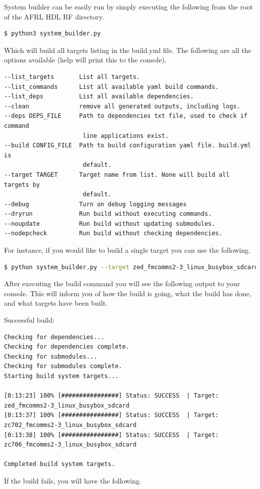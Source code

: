 \par
System builder can be easily run by simply executing the following from the root of the AFRL HDL RF directory.
\begin{lstlisting}[language=bash]
$ python3 system_builder.py
\end{lstlisting}
Which will build all targets listing in the build.yml file. The following are all the options available (\textendash help will print this to the console).
\begin{lstlisting}[language={}]
--list_targets       List all targets.
--list_commands      List all available yaml build commands.
--list_deps          List all available dependencies.
--clean              remove all generated outputs, including logs.
--deps DEPS_FILE     Path to dependencies txt file, used to check if command
                      line applications exist.
--build CONFIG_FILE  Path to build configuration yaml file. build.yml is
                      default.
--target TARGET      Target name from list. None will build all targets by
                      default.
--debug              Turn on debug logging messages
--dryrun             Run build without executing commands.
--noupdate           Run build without updating submodules.
--nodepcheck         Run build without checking dependencies.
\end{lstlisting}
For instance, if you would like to build a single target you can use the following.
\begin{lstlisting}[language=bash]
$ python system_builder.py --target zed_fmcomms2-3_linux_busybox_sdcard
\end{lstlisting}

\par
After executing the build command you will see the following output to your console. This will inform you of how the build is going,
what the build has done, and what targets have been built.

\par
Successful build:
\begin{lstlisting}[language={}]
Checking for dependencies...
Checking for dependencies complete.
Checking for submodules...
Checking for submodules complete.
Starting build system targets...

[0:13:23] 100% [################] Status: SUCCESS  | Target: zed_fmcomms2-3_linux_busybox_sdcard
[0:13:37] 100% [################] Status: SUCCESS  | Target: zc702_fmcomms2-3_linux_busybox_sdcard
[0:13:38] 100% [################] Status: SUCCESS  | Target: zc706_fmcomms2-3_linux_busybox_sdcard

Completed build system targets.
\end{lstlisting}
If the build fails, you will have the following.

